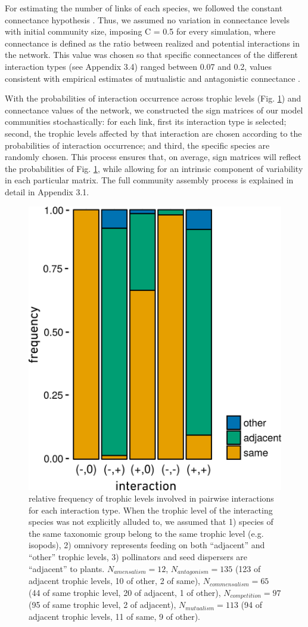 For estimating the number of links of each species, we followed the constant connectance hypothesis \citep{Martinez1992}. Thus, we assumed no variation in connectance levels with initial community size, imposing C = 0.5 for every simulation, where connectance is defined as the ratio between realized and potential interactions in the network. This value was chosen so that specific connectances of the different interaction types (see Appendix 3.4) ranged between 0.07 and 0.2, values consistent with empirical estimates of mutualistic and antagonistic connectance \citep{Thebault2010}.

With the probabilities of interaction occurrence across trophic levels (Fig. \ref{fig:fig3.1}) and connectance values of the network, we constructed the sign matrices of our model communities stochastically: for each link, first its interaction type is selected; second, the trophic levels affected by that interaction are chosen according to the probabilities of interaction occurrence; and third, the specific species are randomly chosen. This process ensures that, on average, sign matrices will reflect the probabilities of Fig. \ref{fig:fig3.1}, while allowing for an intrinsic component of variability in each particular matrix. The full community assembly process is explained in detail in Appendix 3.1.

\begin{figure}[!ht]
\centering
\includegraphics[width=.5\textwidth]{./Figures/chapter03/Fig_1.png}
\caption[Interaction occurrences across trophic levels]{\color{Gray} relative frequency of trophic levels involved in pairwise interactions for each interaction type. When the trophic level of the interacting species was not explicitly alluded to, we assumed that 1) species of the same taxonomic group belong to the same trophic level (e.g. isopods), 2) omnivory represents feeding on both “adjacent” and “other” trophic levels, 3) pollinators and seed dispersers are “adjacent” to plants. $N_{amensalism} = 12$, $N_{antagonism} = 135$ (123 of adjacent trophic levels, 10 of other, 2 of same), $N_{commensalism} = 65$ (44 of same trophic level, 20 of adjacent, 1 of other), $N_{competition} = 97$ (95 of same trophic level, 2 of adjacent), $N_{mutualism} = 113$ (94 of adjacent trophic levels, 11 of same, 9 of other).}
\label{fig:fig3.1}
\end{figure}

